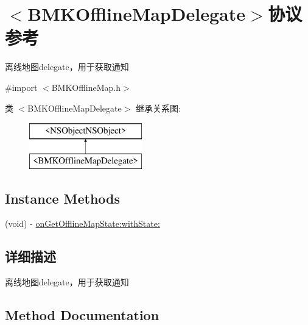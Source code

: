 \hypertarget{protocol_b_m_k_offline_map_delegate-p}{}\section{$<$B\+M\+K\+Offline\+Map\+Delegate$>$协议 参考}
\label{protocol_b_m_k_offline_map_delegate-p}


离线地图delegate，用于获取通知  




{\ttfamily \#import $<$B\+M\+K\+Offline\+Map.\+h$>$}

类 $<$B\+M\+K\+Offline\+Map\+Delegate$>$ 继承关系图\+:\begin{figure}[H]
\begin{center}
\leavevmode
\includegraphics[height=2.000000cm]{protocol_b_m_k_offline_map_delegate-p}
\end{center}
\end{figure}
\subsection*{Instance Methods}
\begin{DoxyCompactItemize}
\item 
(void) -\/ \hyperlink{protocol_b_m_k_offline_map_delegate-p_abe1dd90ae5ffd9612423c547ab9b1970}{on\+Get\+Offline\+Map\+State\+:with\+State\+:}
\end{DoxyCompactItemize}


\subsection{详细描述}
离线地图delegate，用于获取通知 

\subsection{Method Documentation}
\hypertarget{protocol_b_m_k_offline_map_delegate-p_abe1dd90ae5ffd9612423c547ab9b1970}{}

